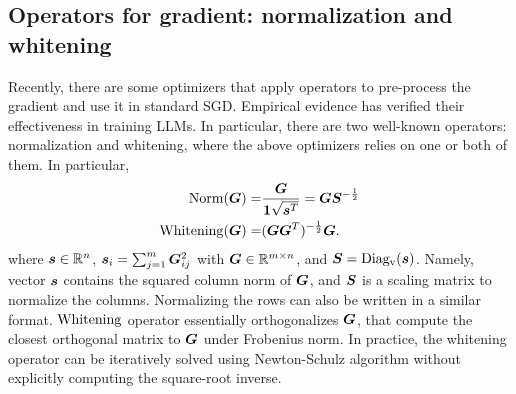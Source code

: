 \subsection{Operators for gradient: normalization and whitening}
\label{subapp: normalization and whitening}
Recently, there are some optimizers \citep{ma2024swan, jordan2024muon, you2017lars, you2019lamb} that apply operators to pre-process the gradient and use it in standard SGD. Empirical evidence has verified their effectiveness in training LLMs. In particular, there are two well-known operators: normalization and whitening, where the above optimizers relies on one or both of them. In particular,
\begin{align}
    \operatorname{Norm}({\bm{G}}) =& \frac{{\bm{G}}}{\bm{1}\sqrt{{\bm{s}}^T}}= {\bm{G}}{\bm{S}}^{-\frac{1}{2}}\\
    \operatorname{Whitening}({\bm{G}}) =& ({\bm{G}}{\bm{G}}^T)^{-\frac{1}{2}}{\bm{G}}.
\end{align}
where ${\bm{s}}\in\mathbb{R}^n$, ${\bm{s}}_i= \sum_{j=1}^m {\bm{G}}^2_{ij}$ with ${\bm{G}}\in\mathbb{R}^{m\times n}$, and ${\bm{S}}=\operatorname{Diag_v}({\bm{s}})$. Namely, vector ${\bm{s}}$ contains the squared column norm of ${\bm{G}}$, and ${\bm{S}}$ is a scaling matrix to normalize the columns. Normalizing the rows can also be written in a similar format. 
$\operatorname{Whitening}$ operator essentially orthogonalizes ${\bm{G}}$, that compute the closest orthogonal matrix to ${\bm{G}}$ under Frobenius norm. In practice, the whitening operator can be iteratively solved using Newton-Schulz algorithm without explicitly computing the square-root inverse. 


